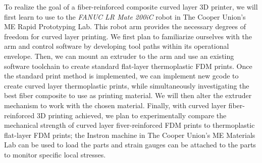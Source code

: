 \documentclass[letter,10pt,english]{article}
\begin{document}

To realize the goal of a fiber-reinforced composite curved layer 3D printer, we will first learn to use to the \emph{FANUC LR Mate 200iC} robot in The Cooper Union's ME Rapid Prototyping Lab. This robot arm provides the necessary degrees of freedom for curved layer printing. We first plan to familiarize ourselves with the arm and control software by developing tool paths within its operational envelope. Then, we can mount an extruder to the arm and use an existing software toolchain to create standard flat-layer thermoplastic FDM prints. Once the standard print method is implemented, we can implement new gcode to create curved layer thermoplastic prints, while simultaneously investigating the best fiber composite to use as printing material. We will then alter the extruder mechanism to work with the chosen material. Finally, with curved layer fiber-reinforced 3D printing achieved, we plan to experimentally compare the mechanical strength of curved layer fiver-reinforced FDM prints to thermoplastic flat-layer FDM prints; the Instron machine in The Cooper Union's ME Materials Lab can be used to load the parts and strain gauges can be attached to the parts to monitor specific local stresses.

\end{document}
